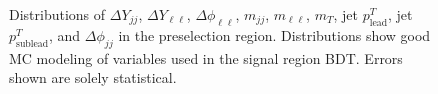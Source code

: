\begin{figure}[!h]
{  }\hfill
  \hfill
  \hfill
{\caption{Distributions of $\Delta Y_{jj}$, $\Delta Y_{\ell\ell}$, $\Delta \phi_{\ell\ell}$, $m_{jj}$, $m_{\ell\ell}$, $m_T$, jet $p^T_{\text{lead}}$, jet $p^T_{\text{sublead}}$, and $\Delta \phi_{jj}$ in the preselection region. Distributions show good MC modeling of variables used in the signal region BDT. Errors shown are solely statistical.
\label{fig:preselection}}}
\end{figure} 

